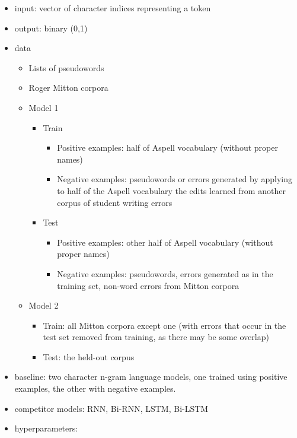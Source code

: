 \begin{itemize}
    \item input: vector of character indices representing a token
    \item output: binary (0,1)
    \item data
    \begin{itemize}
        \item Lists of pseudowords
        \item Roger Mitton corpora
        \item Model 1
        \begin{itemize}
            \item Train
            \begin{itemize}
                \item Positive examples: half of Aspell vocabulary (without proper names)
                \item Negative examples: pseudowords or errors generated by applying to half of the Aspell vocabulary the edits learned from another corpus of student writing errors 
            \end{itemize}
            \item Test
            \begin{itemize}
                \item Positive examples: other half of Aspell vocabulary (without proper names)
                \item Negative examples: pseudowords, errors generated as in the training set, non-word errors from Mitton corpora 
            \end{itemize}
        \end{itemize}
        \item Model 2
        \begin{itemize}
            \item Train: all Mitton corpora except one (with errors that occur in the test set removed from training, as there may be some overlap)
            \item Test: the held-out corpus
        \end{itemize}
    \end{itemize}
    \item baseline: two character n-gram language models, one trained using positive examples, the other with negative examples.
    \item competitor models: RNN, Bi-RNN, LSTM, Bi-LSTM
    \item hyperparameters:
    \begin{itemize}

\end{itemize}
\end{itemize}
